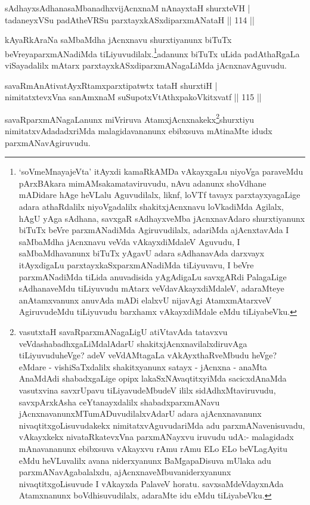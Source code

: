 
\begin{shl}
sAdhayxsAdhanasaMbanadhxvijAcnxnaM nAnayxtaH shurxteVH |\\
tadaneyxVSu padAtheVRSu parxtayxkASxdiparxmANataH \hfill || 114 ||
\end{shl}

\begin{artha}
kAyaRkAraNa saMbaMdha jAcnxnavu shurxtiyanunx biTuTx beVreyaparxmANadiMda tiLiyuvudilalx.\footnote{`soVmeMnayajeVta' itAyxdi kamaRkAMDa vAkayxgaLu niyoVga paraveMdu pArxBAkara mimAMsakamataviruvudu, nAvu adanunx shoVdhane mADidare hAge heVLalu Aguvudilalx, liknf, loVTf tavayx  parxtayxyagaLige adara athaRdalilx niyoVgadalilx shakitxjAcnxnavu loVkadiMda Agilalx, hAgU yAga sAdhana, savxgaR sAdhayxveMba jAcnxnavAdaro shurxtiyanunx biTuTx beVre parxmANadiMda Agiruvudilalx, adariMda ajAcnxtavAda I saMbaMdha jAcnxnavu veVda vAkayxdiMdaleV Aguvudu, I saMbaMdhavanunx biTuTx yAgavU adara sAdhanavAda darxvayx itAyxdigaLu parxtayxkaSxparxmANadiMda tiLiyuvavu, I beVre parxmANadiMda tiLida anuvadisida yAgAdigaLu savxgARdi PalagaLige sAdhanaveMdu tiLiyuvudu mAtarx veVdavAkayxdiMdaleV, adaraMteye anAtamxvanunx anuvAda mADi elalxvU nijavAgi AtamxmAtarxveV AgiruvudeMdu tiLiyuvudu barxhamx vAkayxdiMdale eMdu tiLiyabeVku.}adanunx biTuTx uLida padAthaRgaLa viSayadalilx mAtarx parxtayxkASxdiparxmANagaLiMda jAcnxnavAguvudu.
\end{artha}

\begin{shl}
savaRmAnAtivatAyxRtamxparxtipatwtx tataH shurxtiH |\\
nimitatxtevxVna sanAmxnaM suSupotxVtAthxpakoVkitxvatf \hfill || 115 ||
\end{shl}

\begin{artha}
savaRparxmANagaLanunx miVriruva AtamxjAcnxnakekx\footnote{vasutxtaH savaRparxmANagaLigU atiVtavAda tatavxvu veVdashabadhxgaLiMdalAdarU shakitxjAcnxnavilalxdiruvAga tiLiyuvuduheVge? adeV veVdAMtagaLa vAkAyxthaRveMbudu heVge? eMdare - vishiSaTxdalilx shakitxyanunx satayx - jAcnxna - anaMta AnaMdAdi shabadxgaLige opipx lakaSxNAvaqtitxyiMda sacicxdAnaMda vasutxvina savxrUpavu tiLiyavudeMbudeV ililx sidAdhxMtaviruvudu, savxpArxkAsha ceYtanayxdalilx shabadxparxmANavu jAcnxnavanunxMTumADuvudilalxvAdarU adara ajAcnxnavanunx nivaqtitxgoLisuvudakekx nimitatxvAguvudariMda adu parxmANavenisuvadu, vAkayxkekx nivataRkatevxVna parxmANayxvu iruvudu udA:- malagidadx mAnavananunx ebibxsuva vAkayxvu rAmu rAmu ELo ELo beVLagAyitu eMdu heVLuvalilx avana niderxyanunx BaMgapaDisuva mUlaka adu parxmANavAgabalalxdu, ajAcnxnaveMbuvaniderxyanunx nivaqtitxgoLisuvude I vAkayxda PalaveV horatu. savxsaMdeVdayxnAda Atamxnanunx boVdhisuvudilalx, adaraMte idu eMdu tiLiyabeVku.}shurxtiyu nimitatxvAdadadxriMda 
malagidavananunx ebibxsuva mAtinaMte idudx parxmANavAgiruvudu.
\end{artha}

